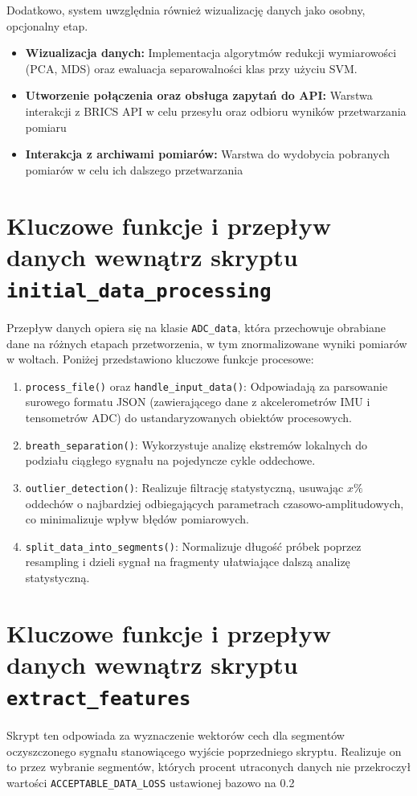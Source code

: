 Dodatkowo, system uwzględnia również wizualizację danych jako osobny, opcjonalny etap.
\begin{itemize}
    \item \textbf{Wizualizacja danych:} 
        Implementacja algorytmów redukcji wymiarowości (PCA, MDS)
        oraz ewaluacja separowalności klas przy użyciu SVM.
     \item \textbf{Utworzenie połączenia oraz obsługa zapytań do API:} Warstwa interakcji z BRICS API w celu przesyłu oraz odbioru wyników przetwarzania pomiaru
     \item \textbf{Interakcja z archiwami pomiarów:} Warstwa do wydobycia pobranych pomiarów w celu ich dalszego przetwarzania
\end{itemize}

\section{Kluczowe funkcje i przepływ danych wewnątrz skryptu \textnormal{\texttt{initial\_data\_processing}}}
Przepływ danych opiera się na klasie \texttt{ADC\_data}, która przechowuje
obrabiane dane na różnych etapach przetworzenia, w tym znormalizowane
wyniki pomiarów w woltach. Poniżej przedstawiono kluczowe funkcje procesowe:

\begin{enumerate}
    \item \texttt{process\_file()} oraz \texttt{handle\_input\_data()}: 
        Odpowiadają za parsowanie surowego formatu JSON (zawierającego dane z akcelerometrów
        IMU i tensometrów ADC) do ustandaryzowanych obiektów procesowych.
    \item \texttt{breath\_separation()}: 
        Wykorzystuje analizę ekstremów lokalnych do podziału ciągłego sygnału na
        pojedyncze cykle oddechowe.
    \item \texttt{outlier\_detection()}: 
        Realizuje filtrację statystyczną, usuwając $x\%$ oddechów o najbardziej 
        odbiegających parametrach czasowo-amplitudowych, co minimalizuje wpływ błędów pomiarowych.
    \item \texttt{split\_data\_into\_segments()}: 
        Normalizuje długość próbek poprzez resampling i dzieli sygnał na fragmenty
        ułatwiające dalszą analizę statystyczną.
\end{enumerate}

\section{Kluczowe funkcje i przepływ danych wewnątrz skryptu \textnormal{\texttt{extract\_features}}}
Skrypt ten odpowiada za wyznaczenie wektorów cech dla segmentów oczyszczonego sygnału stanowiącego wyjście
poprzedniego skryptu. Realizuje on to przez wybranie segmentów, których procent utraconych danych nie
przekroczył wartości \texttt{ACCEPTABLE\_DATA\_LOSS} ustawionej bazowo na 0.2

